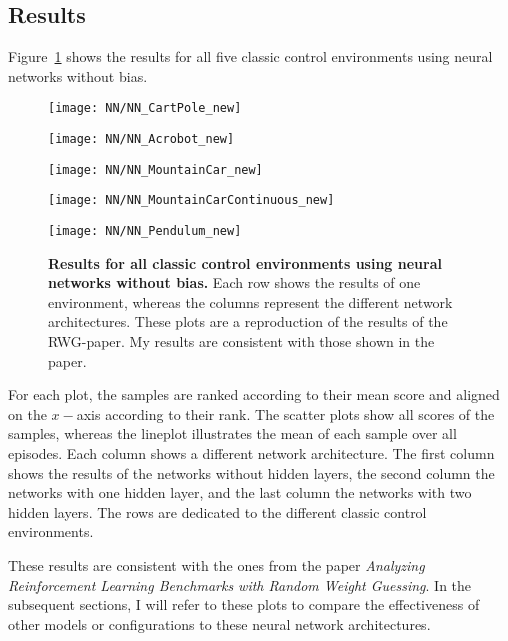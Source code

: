 \subsection{Results}
Figure~\ref{fig:results_NN} shows the results for all five classic control environments using neural networks without bias.
\begin{figure}
  \centering
  \texttt{[image: NN/NN\_CartPole\_new]}

      \vspace{0.2cm}

  \texttt{[image: NN/NN\_Acrobot\_new]}

      \vspace{0.2cm}

  \texttt{[image: NN/NN\_MountainCar\_new]}

      \vspace{0.2cm}

  \texttt{[image: NN/NN\_MountainCarContinuous\_new]}

      \vspace{0.2cm}

  \texttt{[image: NN/NN\_Pendulum\_new]}
\caption[Results for all classic control environments using neural networks without bias]{
  \textbf{Results for all classic control environments using neural networks without bias.}
   Each row shows the results of one environment, whereas the columns represent the different network architectures. These plots are a reproduction of the results of the RWG-paper. My results are consistent with those shown in the paper.
}
\label{fig:results_NN}
\end{figure}
For each plot, the samples are ranked according to their mean score and aligned on the $x-$axis according to their rank. The scatter plots show all scores of the samples, whereas the lineplot illustrates the mean of each sample over all episodes. Each column shows a different network architecture. The first column shows the results of the networks without hidden layers, the second column the networks with one hidden layer, and the last column the networks with two hidden layers. The rows are dedicated to the different classic control environments.

These results are consistent with the ones from the paper \emph{Analyzing Reinforcement Learning Benchmarks with Random Weight Guessing}. In the subsequent sections, I will refer to these plots to compare the effectiveness of other models or configurations to these neural network architectures.

